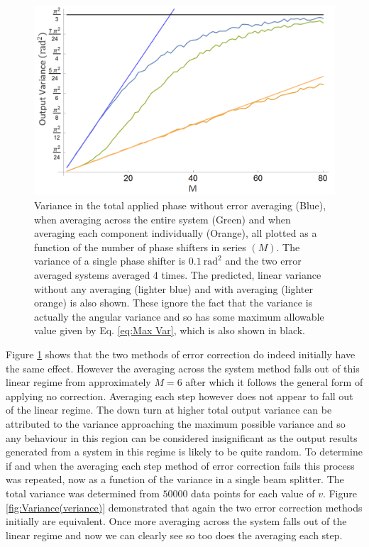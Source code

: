 \documentclass[aps,pra,twocolumn,superscriptaddress,numerical]{revtex4-1}
\begin{document}
			
			\begin{figure}
				\begin{centering}
					\includegraphics[width=\columnwidth]{phase_all.png}
					\par\end{centering}
				
				\caption[Variance of the total applied phase as a function of the number of components. ]{Variance in the total applied phase without error averaging (Blue), when averaging across the entire system (Green) and when averaging each component individually (Orange), all plotted as a function of the number of phase shifters in series $(M)$. The variance of a single phase shifter is $0.1\ \textrm{rad}^{2}$ and the two error averaged systems averaged 4 times. The predicted, linear variance without any averaging (lighter blue) and with averaging (lighter orange) is also shown. These ignore the fact that the variance is actually the angular variance and so has some maximum allowable value given by Eq. \ref{eq:Max Var}, which is also shown in black. \label{fig:Variance-in-phase all}}
				
				
			\end{figure}
			
			
			Figure \ref{fig:Variance-in-phase all} shows that the two methods 	of error correction do indeed initially have the same effect. However the averaging across the system method falls out of this linear regime from approximately $M=6$ after which it follows the general form of applying no correction. Averaging each step however does not appear to fall out of the linear regime. The down turn at higher total output variance can be attributed to the variance approaching the maximum possible variance and so any behaviour in this region can be considered insignificant as the output results generated from a system in this regime is likely to be quite random. To determine if and when the averaging each step method of error correction fails this process was repeated, now as a function of the variance in a single beam splitter. The total variance was determined from $50000$ data points for each value of $v$. Figure \ref{fig:Variance(veriance)} demonstrated that again the two error correction methods initially are equivalent. Once more averaging across the system falls out of the linear regime and now we can clearly see so too does the averaging each step.
			
\end{document}
